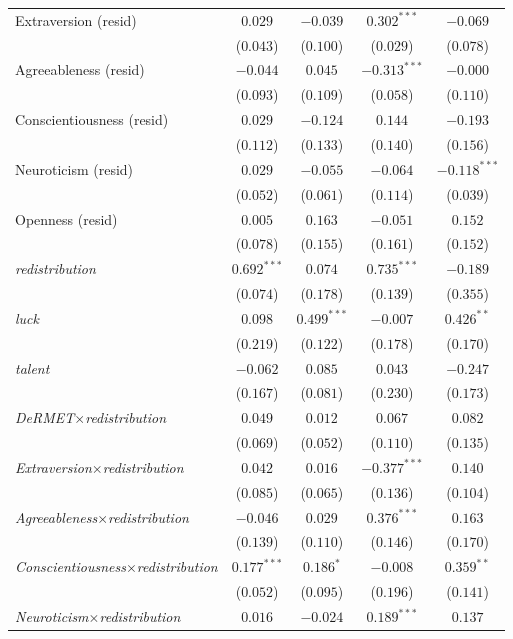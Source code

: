 \begin{footnotesize}
\begin{longtable}{l cc cc}
Extraversion (resid) & $0.029$ & $-0.039$ & $0.302^{***}$ & $-0.069$ \\
    & ($0.043$) & ($0.100$) & ($0.029$) & ($0.078$) \\
Agreeableness (resid) & $-0.044$ & $0.045$ & $-0.313^{***}$ & $-0.000$ \\
    & ($0.093$) & ($0.109$) & ($0.058$) & ($0.110$) \\
Conscientiousness (resid) & $0.029$ & $-0.124$ & $0.144$ & $-0.193$ \\
    & ($0.112$) & ($0.133$) & ($0.140$) & ($0.156$) \\
Neuroticism (resid) & $0.029$ & $-0.055$ & $-0.064$ & $-0.118^{***}$ \\
    & ($0.052$) & ($0.061$) & ($0.114$) & ($0.039$) \\
Openness (resid) & $0.005$ & $0.163$ & $-0.051$ & $0.152$ \\
    & ($0.078$) & ($0.155$) & ($0.161$) & ($0.152$) \\
\textit{redistribution} & $0.692^{***}$ & $0.074$ & $0.735^{***}$ & $-0.189$ \\
    & ($0.074$) & ($0.178$) & ($0.139$) & ($0.355$) \\
\textit{luck} & $0.098$ & $0.499^{***}$ & $-0.007$ & $0.426^{**}$ \\
    & ($0.219$) & ($0.122$) & ($0.178$) & ($0.170$) \\
\textit{talent} & $-0.062$ & $0.085$ & $0.043$ & $-0.247$ \\
    & ($0.167$) & ($0.081$) & ($0.230$) & ($0.173$) \\
\textit{DeRMET}$\times$\textit{redistribution} & $0.049$ & $0.012$ & $0.067$ & $0.082$ \\
    & ($0.069$) & ($0.052$) & ($0.110$) & ($0.135$) \\
\textit{Extraversion}$\times$\textit{redistribution} & $0.042$ & $0.016$ & $-0.377^{***}$ & $0.140$ \\
    & ($0.085$) & ($0.065$) & ($0.136$) & ($0.104$) \\
\textit{Agreeableness}$\times$\textit{redistribution} & $-0.046$ & $0.029$ & $0.376^{***}$ & $0.163$ \\
    & ($0.139$) & ($0.110$) & ($0.146$) & ($0.170$) \\
\textit{Conscientiousness}$\times$\textit{redistribution} & $0.177^{***}$ & $0.186^{*}$ & $-0.008$ & $0.359^{**}$ \\
    & ($0.052$) & ($0.095$) & ($0.196$) & ($0.141$) \\
\textit{Neuroticism}$\times$\textit{redistribution} & $0.016$ & $-0.024$ & $0.189^{***}$ & $0.137$ \\

\end{longtable}
\end{footnotesize}
